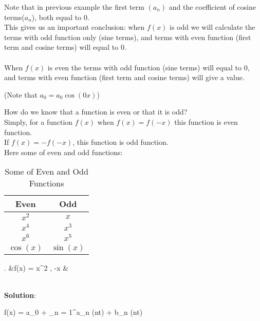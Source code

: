 \documentclass[12pt, a4paper]{article}
\numberwithin{equation}{section}
\begin{document}
	Note that in previous example the first term $(a_n)$ and the coefficient of cosine terms($a_n$), both equal to $0$.\\
	This gives us an important conclusion: when $f(x)$ is odd we will calculate the terms with odd function only (sine terms), and terms with even function (first term and cosine terms) will equal to $0$.\\\\
	When $f(x)$ is even the terms with odd function (sine terms) will equal to $0$, and terms with even function (first term and cosine terms) will give a value.
	\begin{center}
		(Note that $a_0 = a_0 \cos(0x)$)
	\end{center}
	How do we know that a function is even or that it is odd?\\
	Simply, for a function $f(x)$ when $f(x) = f(-x)$ this function is even function.\\
	If $f(x) = -f(-x)$, this function is odd function. \cite{storyofmathematics.com_2021}\\
	
	Here some of even and odd functions:\\
	\begin{table}[h!]
		\centering
		\begin{tabular}{|c|c|}
			\hline \textbf{\large Even} & \textbf{\large Odd}\\
			\hline $x^2$ & $x$\\
			\hline $x^4$ & $x^3$\\
			\hline $x^6$ & $x^5$\\
			\hline $\cos(x)$ & $\sin(x)$\\
			\hline
		\end{tabular}
		\caption{Some of Even and Odd Functions}
		\label{table_even_odd_func}
	\end{table}
	\pagebreak
	
	\begin{flalign}.\hspace{0.3cm} &f(x) = x^2\hspace{0.1cm} , \hspace{2cm} -\pi \leq x \leq \pi&
	\end{flalign}\\
	
	\textbf{Solution}:\\
	{\color{darkgray}
		\begin{flalign*}
			f(x) = a_0 + \sum_{n = 1}^\infty a_n \cos(nt) + b_n \sin(nt)
		\end{flalign*}
	}
\end{document}
